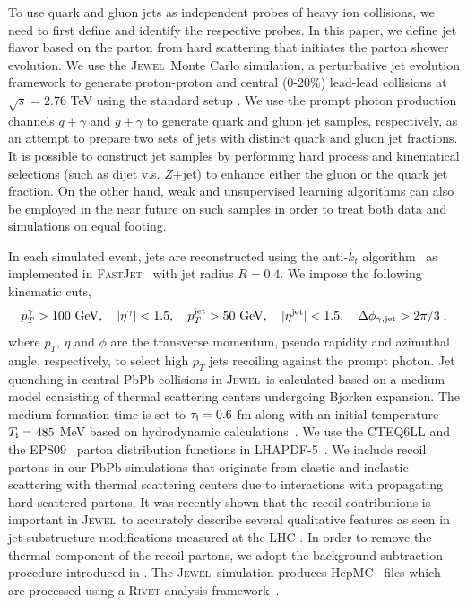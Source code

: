 \documentclass[notoc,preprintnumbers]{JHEP3}
\newcommand{\text}[1]{{\rm #1}}
\newcommand{\jw}{\textsc{Jewel}~}
\begin{document}
To use quark and gluon jets as independent probes of heavy ion collisions, we need to first define and identify the respective probes. In this paper, we define jet flavor based on the parton from hard scattering that initiates the parton shower evolution. We use the \jw Monte Carlo simulation, a perturbative jet evolution framework to generate proton-proton and central (0-20\%) lead-lead collisions at $\sqrt{s}=2.76$ TeV using the standard setup \cite{Zapp:2013zya}. We use the prompt photon production channels \cite{KunnawalkamElayavalli:2016ttl} $q +\gamma$ and $g +\gamma$ to generate quark and gluon jet samples, respectively, as an attempt to prepare two sets of jets with distinct quark and gluon jet fractions. It is possible to construct jet samples by performing hard process and kinematical selections (such as dijet v.s. $Z$+jet) to enhance either the gluon or the quark jet fraction. On the other hand, weak and unsupervised learning algorithms \cite{Dery:2017fap, Cohen:2017exh, Metodiev:2017vrx,Komiske:2018oaa,Metodiev:2018ftz} can also be employed in the near future on such samples in order to treat both data and simulations on equal footing.

In each simulated event, jets are reconstructed using the anti-$k_t$ algorithm~\cite{Cacciari:2008gp} as implemented in \textsc{FastJet}~\cite{Cacciari:2011ma} with jet radius $R = 0.4$. We impose the following kinematic cuts,
\begin{equation}
    p^{\gamma}_T > 100~{\rm GeV}, ~~~ |\eta^{\rm \gamma}|<1.5, ~~~ p^{\rm jet}_T > 50~{\rm GeV}, ~~~ |\eta^{\rm jet}|<1.5, ~~~\Delta \phi_{\gamma, {\rm jet}} > 2\pi/3\;,
\end{equation}
where $p_T$, $\eta$ and $\phi$ are the transverse momentum, pseudo rapidity and azimuthal angle, respectively, to select high $p_T$ jets recoiling against the prompt photon. Jet quenching in central PbPb collisions in \jw is calculated based on a medium model consisting of thermal scattering centers undergoing Bjorken expansion. The medium formation time is set to $\tau_\text{i}=0.6 $ fm along with an initial temperature $T_\text{i}=485$ MeV based on hydrodynamic calculations~\cite{Shen:2012vn,Shen:2014vra}. We use the \textsc{CTEQ6LL} \cite{Pumplin:2002vw} and the \textsc{EPS09}~\cite{Eskola:2009uj} parton distribution functions in \textsc{LHAPDF-5}~\cite{Whalley:2005nh}. We include recoil partons in our PbPb simulations that originate from elastic and inelastic scattering with thermal scattering centers due to interactions with propagating hard scattered partons. It was recently shown that the recoil contributions is important in \jw to accurately describe several qualitative features as seen in jet substructure modifications measured at the LHC \cite{KunnawalkamElayavalli:2017hxo,Milhano:2017nzm}. In order to remove the thermal component of the recoil partons, we adopt the background subtraction procedure introduced in \cite{KunnawalkamElayavalli:2017hxo,Milhano:2017nzm}. The \jw simulation produces HepMC~\cite{Dobbs:2001ck} files which are processed using a \textsc{Rivet} analysis framework~\cite{Buckley:2010ar}.
\end{document}
